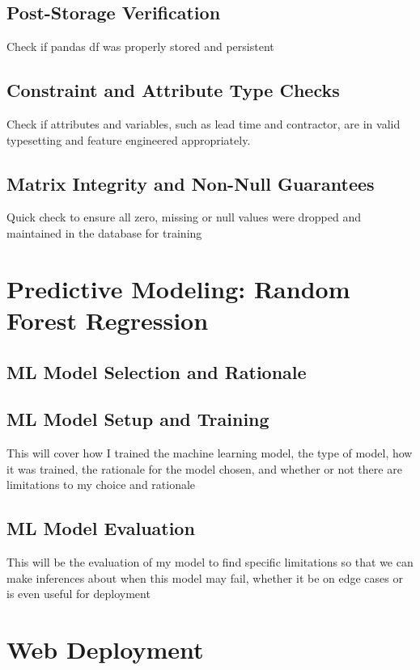 \documentclass[runningheads]{llncs}
\begin{document}
\subsection{Post-Storage Verification}
Check if pandas df was properly stored and persistent

\subsection{Constraint and Attribute Type Checks}
Check if attributes and variables, such as lead time and contractor, are in valid typesetting and feature engineered appropriately.

\subsection{Matrix Integrity and Non-Null Guarantees}
Quick check to ensure all zero, missing or null values were dropped and maintained in the database for training

\section{Predictive Modeling: Random Forest Regression}

\subsection{ML Model Selection and Rationale}

\subsection{ML Model Setup and Training}
This will cover how I trained the machine learning model, the type of model, how it was trained, the rationale for the model chosen, and whether or not there are limitations to my choice and rationale

\subsection{ML Model Evaluation}
This will be the evaluation of my model to find specific limitations so that we can make inferences about when this model may fail, whether it be on edge cases or is even useful for deployment

\section{Web Deployment}
\end{document}
